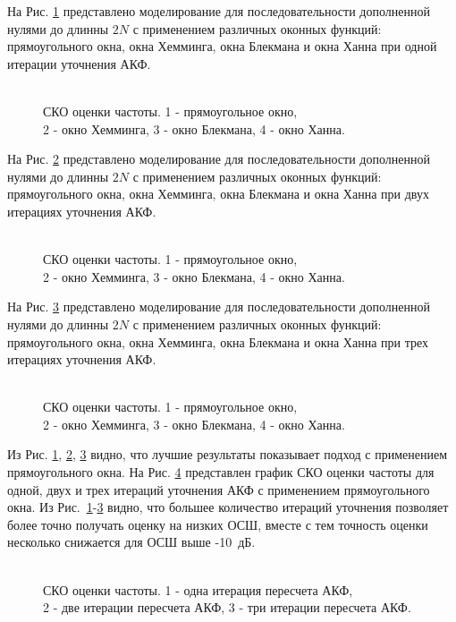 На Рис. \ref{pic:fft2_1} представлено моделирование для последовательности дополненной нулями до длинны ${2N}$ с применением различных оконных функций:
прямоугольного окна, окна Хемминга, окна Блекмана и окна Ханна при одной итерации уточнения АКФ.
\begin{figure}[h]
	\center{}
	\caption{\\СКО оценки частоты. 1 - прямоугольное окно,\\2 - окно Хемминга, 3 - окно Блекмана, 4 - окно Ханна.}
	\label{pic:fft2_1}
\end{figure}

На Рис. \ref{pic:fft2_2} представлено моделирование для последовательности дополненной нулями до длинны ${2N}$ с применением различных оконных функций:
прямоугольного окна, окна Хемминга, окна Блекмана и окна Ханна при двух итерациях уточнения АКФ.
\begin{figure}[h]
	\center{}
	\caption{\\СКО оценки частоты. 1 - прямоугольное окно,\\2 - окно Хемминга, 3 - окно Блекмана, 4 - окно Ханна.}
	\label{pic:fft2_2}
\end{figure}

На Рис. \ref{pic:fft2_3} представлено моделирование для последовательности дополненной нулями до длинны ${2N}$ с применением различных оконных функций:
прямоугольного окна, окна Хемминга, окна Блекмана и окна Ханна при трех итерациях уточнения АКФ.
\begin{figure}[h]
	\center{}
	\caption{\\СКО оценки частоты. 1 - прямоугольное окно,\\2 - окно Хемминга, 3 - окно Блекмана, 4 - окно Ханна.}
	\label{pic:fft2_3}
\end{figure}

Из Рис. \ref{pic:fft2_1}, \ref{pic:fft2_2}, \ref{pic:fft2_3} видно, что лучшие результаты показывает подход с применением прямоугольного окна. На Рис. \ref{pic:fft2_rect_1_2_3}
представлен график СКО оценки частоты для одной, двух и трех итераций уточнения АКФ с применением прямоугольного окна. Из \mbox{Рис. \ref{pic:fft2_1}-\ref{pic:fft2_3}}  видно, что большее
количество итераций уточнения позволяет более точно получать оценку на низких ОСШ, вместе с тем точность оценки несколько снижается для ОСШ выше \mbox{-10 дБ.}
\begin{figure}[h]
	\center{}
	\caption{\\СКО оценки частоты. 1 - одна итерация пересчета АКФ,\\2 - две итерации пересчета АКФ, 3 - три итерации пересчета АКФ.}
	\label{pic:fft2_rect_1_2_3}
\end{figure}

